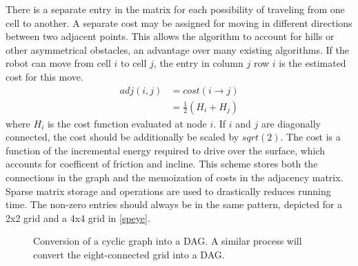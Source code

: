 \documentclass[journal]{IEEEtran}
\begin{document}
There is a separate entry in the matrix for each possibility of traveling from one cell to another.
A separate cost may be assigned for moving in different directions between  two adjacent points. 
This allows the algorithm to account for hills or other asymmetrical obstacles, an advantage over many existing algorithms.
If the robot can move from cell $i$ to cell $j$, the entry in column $j$ row $i$ is the estimated cost for this move. 
\begin{align}
adj(i,j) &= cost(i \rightarrow j) \\
		 &= \frac{1}{2}(H_i + H_j)
\end{align}
where $H_i$ is the cost function evaluated at node $i$. If $i$ and $j$ are diagonally connected, the cost should be additionally be scaled by $sqrt(2)$.
The cost is a function of the incremental energy required to drive over the surface, which accounts for coefficent of friction and incline.
This scheme stores both the connections in the graph and the memoization of costs in the adjacency matrix. 
Sparse matrix storage and operations are used to drastically reduces running time.
The non-zero entries should always be in the same pattern, depicted for a 2x2 grid and a 4x4 grid in \ref{speye}. 

\begin{figure}[h]
\label{DAG}
\begin{center}
\end{center}
\caption{Conversion of a cyclic graph into a DAG. A similar process will convert the eight-connected grid into a DAG.}
\end{figure}
  
\end{document}
